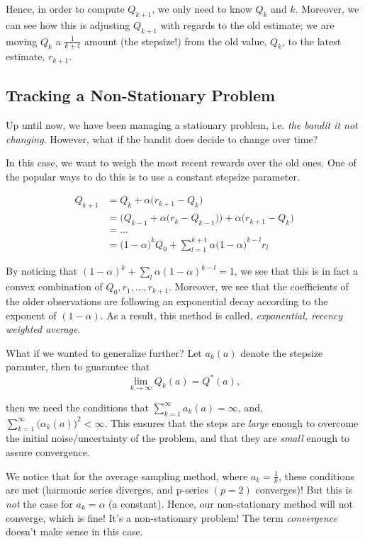 \documentclass[11pt]{article}
\theoremstyle{definition}
\begin{document}
Hence, in order to compute $Q_{k+1}$, we only need to know $Q_k$ and $k$.  Moreover, we can see how this is adjusting $Q_{k+1}$ with regards to the old estimate; we are moving $Q_k$ a $\frac{1}{k+1}$ amount (the stepsize!) from the old value, $Q_k$, to the latest estimate, $r_{k+1}$.

\subsection*{\textcolor{CalPolyGreen}{Tracking a Non-Stationary Problem}}

Up until now, we have been managing a stationary problem, i.e. \textit{the bandit it not changing}.  However, what if the bandit does decide to change over time?

In this case, we want to weigh the most recent rewards over the old ones.  One of the popular ways to do this is to use a constant stepsize parameter.

\begin{align*}
    Q_{k+1} &= Q_k + \alpha\Big(r_{k+1} - Q_k \big) \\
    &= \Bigg(Q_{k-1} + \alpha\big(r_k - Q_{k-1}\big)\Bigg) + \alpha\Big(r_{k+1} - Q_k\big)  \\
    &= \dots	\\
    &= \Big(1 - \alpha\Big)^k Q_0 + \sum_{l=1}^{k+1} \alpha\Big(1 - \alpha\Big)^{k-l} r_l
\end{align*}

By noticing that $(1-\alpha)^k + \sum_l \alpha(1-\alpha)^{k-l} = 1$, we see that this is in fact a convex combination of $Q_0, r_1, \dots, r_{k+1}$.  Moreover, we see that the coefficients of the older observations are following an exponential decay according to the exponent of $(1-\alpha)$.  As a result, this method is called, \textit{exponential, recency weighted average}.

What if we wanted to generalize further?  Let $a_k(a)$ denote the stepsize paramter, then to guarantee that
\[
    \lim_{k\to\infty} Q_k(a) = Q^*(a),
\]

then we need the conditions that $\sum_{k=1}^\infty a_k(a) = \infty$, and, $\sum_{k=1}^\infty \big(\alpha_k(a)\big)^2 < \infty$.  This ensures that the steps are \textit{large} enough to overcome the initial noise/uncertainty of the problem, and that they are \textit{small} enough to assure convergence.

We notice that for the average sampling method, where $a_k = \frac{1}{k}$, these conditions are met (harmonic series diverges, and p-series $(p=2)$ converges)!  But this is \textit{not} the case for $a_k = \alpha$ (a constant).  Hence, our non-stationary method will not converge, which is fine!  It's a non-stationary problem!  The term \textit{convergence} doesn't make sense in this case.
\end{document}
